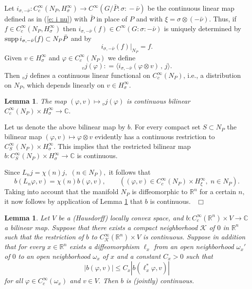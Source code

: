\documentclass[12pt,a4paper]{article}
\newtheorem{Lemma}[Thm]{Lemma}
\newenvironment{lemma}[0]{\begin{Lemma}\noindent}%
{\end{Lemma}}
\def\proof{\par\noindent{\it Proof.}{\ }{\ }}
\def\qed{~\hfill\hbox{$\Box$}\medbreak}
\def\qquad{\quad\quad}
\def\msy#1{{\mathbb #1}}
\def\C{{\msy C}}
\def\R{{\msy R}}
\def\gf{\varphi}
\def\gs{\sigma}
\def\to{\rightarrow}
\def\inp#1#2{\langle#1\,,\,#2\rangle}
\def\cK{{\mathcal K}}
\numberwithin{Thm}{section}
\numberwithin{equation}{section}
\def\supp{{\rm supp}}
\numberwithin{equation}{section}
\def\col{\!:\!}
\def\jv{{}_vj}
\begin{document}
\proof
Let $i_{\gs, -\bar \nu}: C^\infty_c(N_P, H_\gs^\infty) \to 
C^\infty(G/\bar P\col \gs\col  -\bar \nu)$  be the continuous linear map 
defined as in (\ref{e: i nu})
with $\bar P$ in place of $P$ and with $\xi = \gs \otimes (-\bar\nu).$ 
Thus, if $f\in C^\infty_c(N_P, H_\gs^\infty)$ then $i_{\gs,-\bar \nu}(f) \in C^\infty(G:\gs:-\bar \nu)$
is uniquely determined by  
$\supp \, i_{\gs,-\bar \nu}(f) \subset N_P\bar P$ and by 
$$ 
i_{\gs,-\bar \nu}(f)|_{N_P} = f.
$$%
Given $v \in H_\gs^\infty$ and $\gf \in C^\infty_c(N_P)$ 
we define 
$$ 
\jv(\gf): = \inp{i_{\gs, -\bar \nu}(\gf \otimes v)}{j}.
$$%
Then $\jv$ defines a continuous linear functional on $C_c^\infty(N_P)$,
i.e., a distribution on $N_P$, which depends linearly on $v \in H_\gs^\infty.$  
\begin{lemma}
The map $(\gf, v) \mapsto {}_v j(\gf)$ is continuous bilinear
$C_c^\infty(N_P) \times H_\gs^\infty \to \C.$ 
\end{lemma}
\proof
Let us denote the above bilinear map by $b.$ 
For every compact set $S \subset N_P$ the bilinear map 
$(\gf, v)\mapsto \gf \otimes v$  evidently has a continuous restriction to 
$C^\infty_S(N_P) \times H_\gs^\infty.$ This implies that the restricted bilinear map 
$b: C^\infty_S(N_P) \times H_\gs^\infty \to \C$ is continuous. 

Since $L_n j = \chi(n)j,$ $(n \in N_P),$ it follows that 
$$
b(L_n \gf , v) = \chi(n) b(\gf, v), \qquad ((\gf, v)\in C_c^\infty(N_P) \times H_\xi^\infty, \; n \in N_P).
$$ 
Taking into account that the manifold $N_P$ is diffeomorphic to $\R^n$ for a certain $n,$ 
it now follows by application of Lemma \ref{l: b continuous bilinear} that $b$ is continuous.
\qed

\begin{lemma}
\label{l: b continuous bilinear}
Let $V$ be a (Hausdorff) locally convex space, and $b: C_c^\infty(\R^n) \times V \to \C$ 
a bilinear map. 
Suppose that there exists a compact neighborhood $\cK$ of $0$ in $\R^n$ such that the restriction 
of $b$ to $C_\cK^\infty(\R^n) \times V$ is continuous.
 Suppose in addition that  for every $x \in \R^n$ exists a 
diffeomorphism ${\ell}_x$ from an open neighborhood $\omega_x'$ of $0$ to an open neighborhood $\omega_x$ of $x$ and a constant $C_x > 0$ such that 
\begin{equation}
\label{e: condition on b}
|b( \gf , v)| \leq C_x |b(\ell_x^*\gf, v)|
\end{equation} 
for all $\gf \in C^\infty_c(\omega_x)$ and $v \in V.$ 
Then $b$ is (jointly) continuous. 
\end{lemma}
\end{document}
